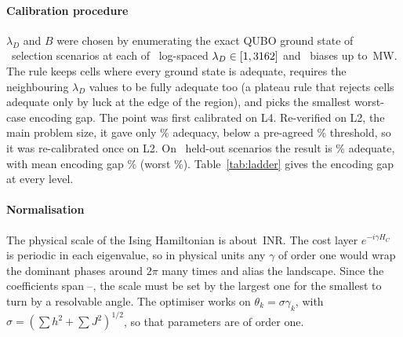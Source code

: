 \documentclass[10pt,conference]{IEEEtran}
\begin{document}
\paragraph{Calibration procedure} $\lambda_D$ and $B$ were chosen by enumerating the exact QUBO ground state of \CalSel\ selection scenarios at each of \CalNLambda\ log-spaced $\lambda_D\in[1,3162]$ and \CalNBias\ biases up to \CalBiasMax\,MW. The rule keeps cells where every ground state is adequate, requires the neighbouring $\lambda_D$ values to be fully adequate too (a plateau rule that rejects cells adequate only by luck at the edge of the region), and picks the smallest worst-case encoding gap. The point was first calibrated on L4. Re-verified on L2, the main problem size, it gave only \FirstPointLtwoAdeq\% adequacy, below a pre-agreed \ReverifyThreshold\% threshold, so it was re-calibrated once on L2. On \CalTest\ held-out scenarios the result is \CalTestAdeq\% adequate, with mean encoding gap \CalTestGapMean\% (worst \CalTestGapWorst\%). Table~\ref{tab:ladder} gives the encoding gap at every level.

\paragraph{Normalisation} The physical scale of the Ising Hamiltonian is about \IsingScaleLtwo\,INR. The cost layer $e^{-i\gamma H_C}$ is periodic in each eigenvalue, so in physical units any $\gamma$ of order one would wrap the dominant phases around $2\pi$ many times and alias the landscape. Since the coefficients span \DynRangeMin--\DynRangeMax, the scale must be set by the largest one for the smallest to turn by a resolvable angle. The optimiser works on $\theta_k=\sigma\gamma_k$, with $\sigma=(\sum h^2+\sum J^2)^{1/2}$, so that parameters are of order one.

\begin{table}[t]
\centering
\caption{Encoding gap on the refinement ladder (\NLadderScen\ fresh scenarios, seed \LadderSeed, identical demand at every level, $T=\NHoursMain$). Left: the frozen operating point ($\lambda_D=\LambdaD$, $B=\BiasB$\,MW). Adeq.: share of scenarios whose QUBO ground state is adequate. Gap and Worst: mean and worst encoding gap. $=$MILP: ground state equals the MILP schedule up to swapping identical blocks. Dyn.\ range: worst-case $\max|c|/\min|c|$ over the nonzero Ising coefficients. Right: each level at its own calibrated point, chosen by the same rule (used only for robustness checks).}
\label{tab:ladder}
\footnotesize

\end{table}
\end{document}
